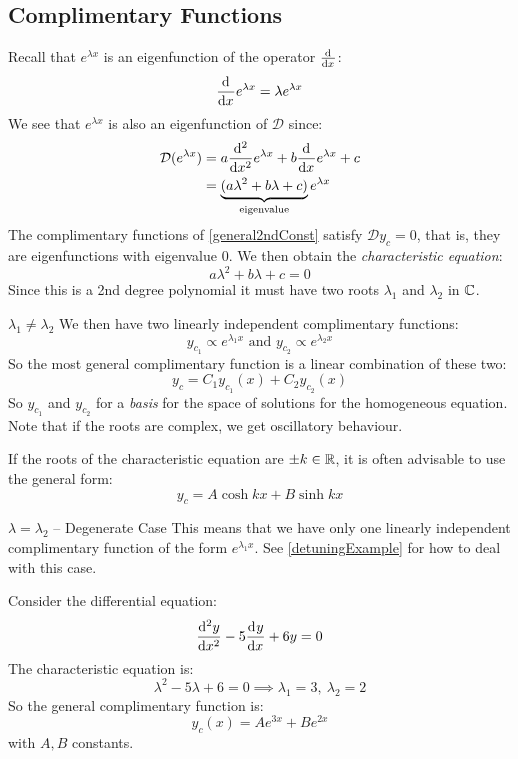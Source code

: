 \documentclass[../main.tex]{subfiles}
\begin{document}
\subsection{Complimentary Functions}
Recall that $e^{\lambda x}$ is an eigenfunction of the operator $\deriv{}{x}$:
\[
  \deriv{}{x} e^{\lambda x} = \lambda e^{\lambda x}
\]
We see that $e^{\lambda x}$ is also an eigenfunction of $\mathcal{D}$ since:
\begin{align*}
  \mathcal{D}(e^{\lambda x}) &= a \deriv[2]{}{x} e^{\lambda x} + b \deriv{}{x} e^{\lambda x} + c \\
                             &= \underbrace{(a\lambda^2 + b\lambda + c)}_{\text{eigenvalue}} e^{\lambda x}
\end{align*}
The complimentary functions of \cref{general2ndConst} satisfy $\mathcal{D}y_c = 0$, that is, they are eigenfunctions with eigenvalue $0$.
We then obtain the \textit{characteristic equation}:
\[
  a \lambda^2 + b\lambda + c = 0
\]
Since this is a 2nd degree polynomial it must have two roots $\lambda_1$ and $\lambda_2$ in $\mathbb{C}$.
\begin{proofcases}
  \begin{case}{$\lambda_1 \neq \lambda_2$}
    We then have two linearly independent complimentary functions:
    \[
      y_{c_1} \propto e^{\lambda_1 x} \text{ and } y_{c_2} \propto e^{\lambda_2 x}
    \]
    So the most general complimentary function is a linear combination of these two:
    \[
      y_c = C_1 y_{c_1}(x) + C_2 y_{c_2}(x)
    \]
    So $y_{c_1}$ and $y_{c_2}$ for a \textit{basis} for the space of solutions for the homogeneous equation.
    Note that if the roots are complex, we get oscillatory behaviour.

    \begin{remark}
      If the roots of the characteristic equation are $\pm k \in \mathbb{R}$, it is often advisable to use the general form:
      \[
        y_c = A\cosh kx + B \sinh kx
      \]
    \end{remark}
  \end{case}
  \begin{case}{$\lambda = \lambda_2$ -- Degenerate Case}
    This means that we have only one linearly independent complimentary function of the form $e^{\lambda_1 x}$.
    See \cref{detuningExample} for how to deal with this case.
  \end{case}
\end{proofcases}
\begin{example}
  Consider the differential equation:
  \[
    \deriv[2]{y}{x} - 5\deriv{y}{x} + 6y = 0
  \]
  The characteristic equation is:
  \[
    \lambda^2 - 5\lambda + 6 = 0 \implies \lambda_1 = 3,\ \lambda_2 = 2
  \]
  So the general complimentary function is:
  \[
    y_c(x) = A e^{3x} + B e^{2x}
  \]
  with $A, B$ constants.
\end{example}
\end{document}
